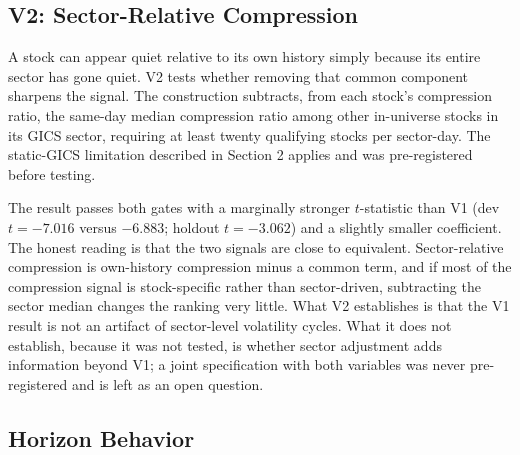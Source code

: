 \documentclass[11pt]{article}
\begin{document}
\subsection{V2: Sector-Relative Compression}

A stock can appear quiet relative to its own history simply because its entire sector has gone quiet. V2 tests whether removing that common component sharpens the signal. The construction subtracts, from each stock's compression ratio, the same-day median compression ratio among other in-universe stocks in its GICS sector, requiring at least twenty qualifying stocks per sector-day. The static-GICS limitation described in Section 2 applies and was pre-registered before testing.

The result passes both gates with a marginally stronger $t$-statistic than V1 (dev $t = -7.016$ versus $-6.883$; holdout $t = -3.062$) and a slightly smaller coefficient. The honest reading is that the two signals are close to equivalent. Sector-relative compression is own-history compression minus a common term, and if most of the compression signal is stock-specific rather than sector-driven, subtracting the sector median changes the ranking very little. What V2 establishes is that the V1 result is not an artifact of sector-level volatility cycles. What it does not establish, because it was not tested, is whether sector adjustment adds information beyond V1; a joint specification with both variables was never pre-registered and is left as an open question.

\subsection{Horizon Behavior}
\end{document}
